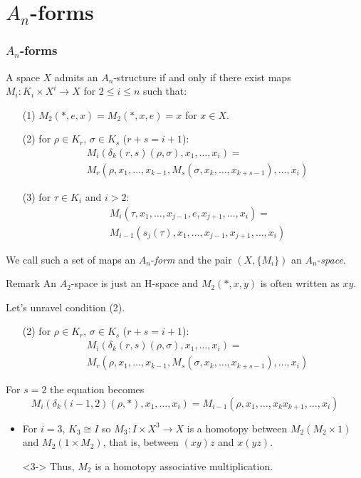 \documentclass{beamer}
\theoremstyle{definition}
\begin{document}
\section{$A_n$-forms}
\begin{frame}
\frametitle{$A_n$-forms}
\begin{theorem}
A space $X$ admits an $A_n$-structure if and only if there exist maps $M_i:K_i\times X^i\to X$ for $2\leq i\leq n$ such that:
\begin{itemize}
\item[(1)] $M_2(*,e,x)=M_2(*,x,e)=x$ for $x\in X$. %
\item[(2)] for $\rho\in K_r$, $\sigma\in K_s$ ($r+s=i+1$):
\begin{align*}
&M_i(\delta_k(r,s)(\rho,\sigma),x_1,\dots, x_i)=\\
&M_r(\rho,x_1,\dots, x_{k-1},M_s(\sigma,x_k,\dots, x_{k+s-1}),\dots, x_i)
\end{align*} %
\item[(3)] for $\tau\in K_i$ and $i>2$:
\begin{align*}
&M_i(\tau,x_1,\dots, x_{j-1},e,x_{j+1},\dots, x_i)=\\
&M_{i-1}(s_j(\tau),x_1,\dots, x_{j-1},x_{j+1},\dots, x_i)
\end{align*}%
\end{itemize}
\end{theorem}
\end{frame}

\begin{frame}
We call such a set of maps an $A_n$-\emph{form} and the pair $(X,\{M_i\})$ an $A_n$-\emph{space}.\pause
\begin{block}{Remark}
An $A_2$-space is just an H-space and $M_2(*,x,y)$ is often written as $xy$.
\end{block}\pause
Let's unravel condition (2).\pause
\begin{itemize}
\item[(2)] for $\rho\in K_r$, $\sigma\in K_s$ ($r+s=i+1$):
\begin{align*}
&M_i(\delta_k(r,s)(\rho,\sigma),x_1,\dots, x_i)=\\
&M_r(\rho,x_1,\dots, x_{k-1},M_s(\sigma,x_k,\dots, x_{k+s-1}),\dots, x_i)
\end{align*} %
\end{itemize}
\end{frame}
\begin{frame}
For $s=2$ the equation becomes
\[
M_i(\delta_k(i-1,2)(\rho,*),x_1,\dots, x_i)=M_{i-1}(\rho,x_1,\dots,x_kx_{k+1},\dots, x_i)
\]
\begin{itemize}
\item<2-> For $i=3$, $K_3\cong I$ so $M_3:I\times X^3\to X$ is a homotopy between $M_2(M_2\times 1)$ and $M_2(1\times M_2)$, that is, between $(xy)z$ and $x(yz)$.
\item[]<3-> Thus, $M_2$ is a homotopy associative multiplication.
\end{itemize}

\end{frame}
\end{document}
